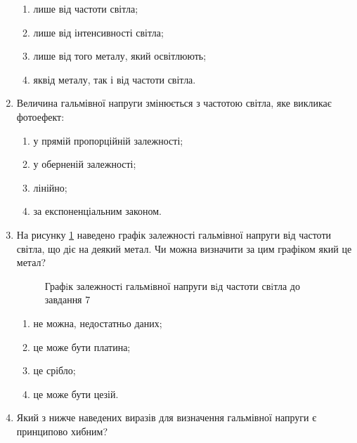 \documentclass[twocolumn]{el-author}
\begin{document}
\begin{enumerate}
	\begin{enumerate}
		\item лише від частоти світла;
		\item лише від інтенсивності світла;
		\item лише від того металу, який освітлюють;
		\item яквід металу, так і від частоти світла.
	\end{enumerate}
	\item Величина гальмівної напруги змінюється з частотою світла, 
		яке викликає фотоефект:
	\begin{enumerate}
		\item у прямій пропорційній залежності;
		\item у оберненій залежності;
		\item лінійно;
		\item за експоненціальним законом.
	\end{enumerate}
	\item На рисунку \ref{img:4} наведено графік залежності гальмівної напруги 
		від частоти світла, що діє на деякий метал. 
		Чи можна визначити за цим графіком який це метал?
		\begin{figure}[ht]
			\caption{Графiк залежностi гальмiвної
напруги вiд частоти свiтла до завдання 7\source{}}
			\label{img:4}
		\end{figure}
	\begin{enumerate}
		\item не можна, недостатньо даних;
		\item це може бути платина;
		\item це срібло;
		\item це може бути цезій.
	\end{enumerate}
	\item Який з нижче наведених виразів для визначення 
		гальмівної напруги є принципово хибним?

\end{enumerate}
\end{document}
